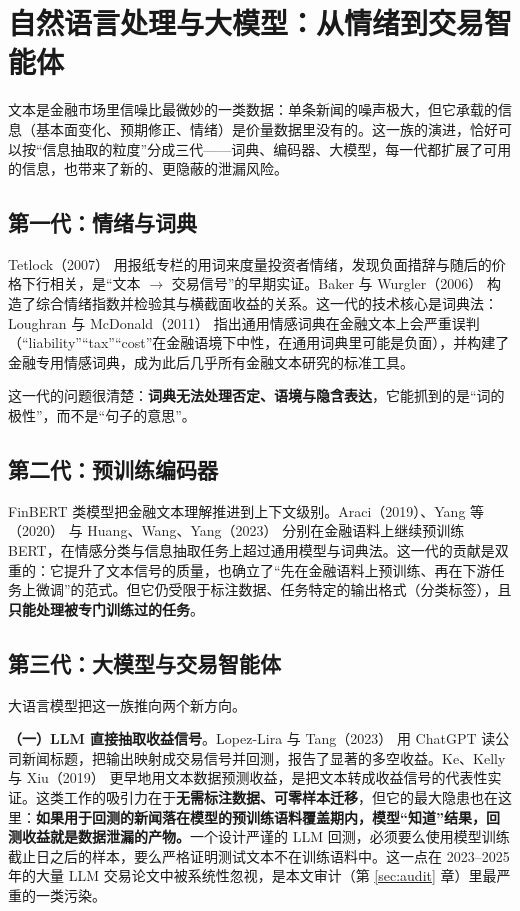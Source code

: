 \section{自然语言处理与大模型：从情绪到交易智能体}\label{sec:nlp}

文本是金融市场里信噪比最微妙的一类数据：单条新闻的噪声极大，但它承载的信息（基本面变化、预期修正、情绪）是价量数据里没有的。这一族的演进，恰好可以按“信息抽取的粒度”分成三代——词典、编码器、大模型，每一代都扩展了可用的信息，也带来了新的、更隐蔽的泄漏风险。

\subsection{第一代：情绪与词典}

Tetlock（2007）\cite{tetlock2007} 用报纸专栏的用词来度量投资者情绪，发现负面措辞与随后的价格下行相关，是“文本 $\to$ 交易信号”的早期实证。Baker 与 Wurgler（2006）\cite{bakerwurgler2006} 构造了综合情绪指数并检验其与横截面收益的关系。这一代的技术核心是词典法：Loughran 与 McDonald（2011）\cite{loughranmcdonald2011} 指出通用情感词典在金融文本上会严重误判（“liability”“tax”“cost”在金融语境下中性，在通用词典里可能是负面），并构建了金融专用情感词典，成为此后几乎所有金融文本研究的标准工具。

这一代的问题很清楚：\textbf{词典无法处理否定、语境与隐含表达}，它能抓到的是“词的极性”，而不是“句子的意思”。

\subsection{第二代：预训练编码器}

FinBERT 类模型把金融文本理解推进到上下文级别。Araci（2019）\cite{araci2019finbert}、Yang 等（2020）\cite{yang2020finbert} 与 Huang、Wang、Yang（2023）\cite{huang2022finbert} 分别在金融语料上继续预训练 BERT，在情感分类与信息抽取任务上超过通用模型与词典法。这一代的贡献是双重的：它提升了文本信号的质量，也确立了“先在金融语料上预训练、再在下游任务上微调”的范式。但它仍受限于标注数据、任务特定的输出格式（分类标签），且\textbf{只能处理被专门训练过的任务}。

\subsection{第三代：大模型与交易智能体}

大语言模型把这一族推向两个新方向。

\textbf{（一）LLM 直接抽取收益信号}。Lopez-Lira 与 Tang（2023）\cite{lopezlira2023} 用 ChatGPT 读公司新闻标题，把输出映射成交易信号并回测，报告了显著的多空收益。Ke、Kelly 与 Xiu（2019）\cite{kebeixiu2019} 更早地用文本数据预测收益，是把文本转成收益信号的代表性实证。这类工作的吸引力在于\textbf{无需标注数据、可零样本迁移}，但它的最大隐患也在这里：\textbf{如果用于回测的新闻落在模型的预训练语料覆盖期内，模型“知道”结果，回测收益就是数据泄漏的产物。}一个设计严谨的 LLM 回测，必须要么使用模型训练截止日之后的样本，要么严格证明测试文本不在训练语料中。这一点在 2023--2025 年的大量 LLM 交易论文中被系统性忽视，是本文审计（第 \ref{sec:audit} 章）里最严重的一类污染。

